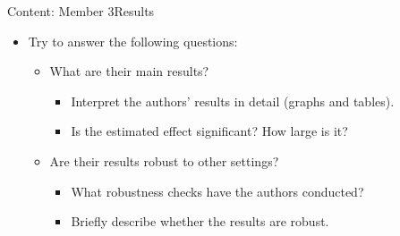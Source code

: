 \documentclass[hyperref={pdfpagelabels=false,hidelinks}]{beamer}
\begin{document}
\begin{frame}{Content: Member 3}{Results}
	\begin{itemize}
		\item Try to answer the following questions:
															\vspace{0.2cm}
		\begin{itemize}
			\item What are their main results?
																\vspace{0.2cm}
			\begin{itemize}
				\item Interpret the authors' results in detail (graphs and tables).
																	\vspace{0.2cm}
				\item Is the estimated effect significant? How large is it?
																	\vspace{0.2cm}
			\end{itemize}
			\item Are their results robust to other settings?
																\vspace{0.2cm}
			\begin{itemize}
				\item What robustness checks have the authors conducted?
																	\vspace{0.2cm}
				\item Briefly describe whether the results are robust.
			\end{itemize}
		\end{itemize}
	\end{itemize}
\end{frame}
\end{document}
